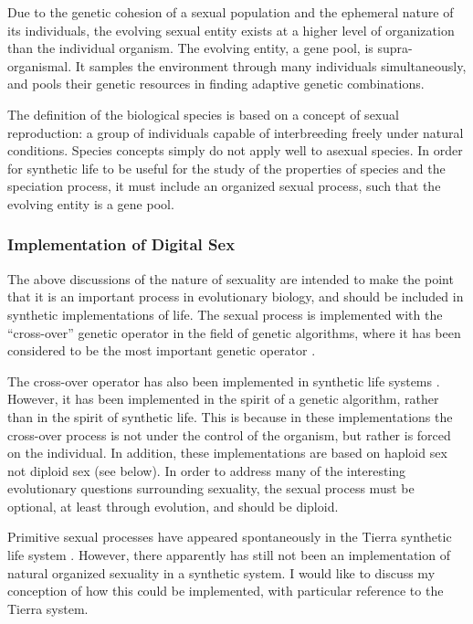 Due to the genetic cohesion of a sexual population and the ephemeral
nature of its individuals, the evolving sexual entity exists at a higher
level of organization than the individual organism.  The evolving entity,
a gene pool, is supra-organismal.  It samples the environment through
many individuals simultaneously, and pools their genetic resources in
finding adaptive genetic combinations. 

The definition of the biological species is based on a concept of
sexual reproduction: a group of individuals capable of interbreeding
freely under natural conditions.  Species concepts simply do not apply
well to asexual species.  In order for synthetic life to be useful
for the study of the properties of species and the speciation process,
it must include an organized sexual process, such that the evolving entity
is a gene pool.

\subsubsection{Implementation of Digital Sex}

The above discussions of the nature of sexuality are intended to
make the point that it is an important process in
evolutionary biology, and should be included in synthetic implementations
of life.  The sexual process is implemented with the ``cross-over''
genetic operator in the field of genetic algorithms, where it has
been considered to be the most important genetic operator \cite{Holl}.

The cross-over operator has also been implemented in synthetic life
systems \cite{RayDo,Tack}.  However, it has been implemented in
the spirit of a genetic algorithm, rather than in the spirit of
synthetic life.   This is because in these implementations the cross-over
process is not under the control of the organism, but rather is forced
on the individual.  In addition, these implementations are based on
haploid sex not diploid sex (see below).  In order to address many of
the interesting evolutionary questions surrounding sexuality, the sexual
process must be optional, at least through evolution, and should
be diploid.

Primitive sexual processes have appeared spontaneously in the Tierra
synthetic life system \cite{Ray91a}.  However, there apparently has
still not been an implementation of natural organized sexuality in
a synthetic system.   I would like to discuss my conception of how
this could be implemented, with particular reference to the Tierra
system.

